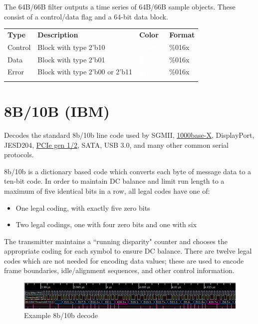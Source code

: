 The 64B/66B filter outputs a time series of 64B/66B sample objects. These consist of a control/data flag and
a 64-bit data block.

\begin{tabularx}{16cm}{lllX}
\thickhline
\textbf{Type} & \textbf{Description} & \textbf{Color} & \textbf{Format} \\
\thickhline
Control & Block with type 2'b10 & \cellcolor{control}\textcolor{white}{Control} & \%016x \\
\thickhline
Data & Block with type 2'b01 & \cellcolor{data}\textcolor{white}{Data} & \%016x \\
\thickhline
Error & Block with type 2'b00 or 2'b11 & \cellcolor{error}\textcolor{white}{Error} & \%016x \\
\thickhline
\end{tabularx}

\pagebreak
\section{8B/10B (IBM)}
\label{filter:8b10b}

Decodes the standard 8b/10b line code used by SGMII, \hyperref[filter:1000basex]{1000base-X}, DisplayPort, JESD204,
\hyperref[filter:pcie2_logical]{PCIe gen 1/2}, SATA, USB 3.0, and many other common serial protocols.

8b/10b is a dictionary based code which converts each byte of message data to a ten-bit code. In order to maintain DC
balance and limit run length to a maximum of five identical bits in a row, all legal codes have one of:
\begin{itemize}
\item One legal coding, with exactly five zero bits
\item Two legal codings, one with four zero bits and one with six
\end{itemize}

The transmitter maintains a ``running disparity" counter and chooses the appropriate coding for each symbol to ensure
DC balance. There are twelve legal codes which are not needed for encoding data values; these are used to encode
frame boundaries, idle/alignment sequences, and other control information.

\begin{figure}[h]
\centering
\includegraphics[width=16cm]{images/filters/8b10b.png}
\caption{Example 8b/10b decode}
\label{filter_8b10b}
\end{figure}

